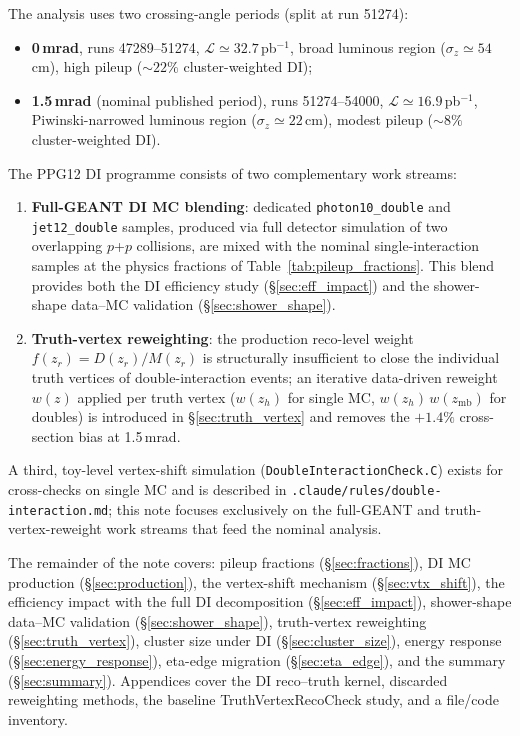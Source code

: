 \documentclass[11pt,a4paper]{article}
\newcommand{\pp}{\mbox{$p$+$p$}\xspace}
\begin{document}
The analysis uses two crossing-angle periods (split at run 51274):
\begin{itemize}
\item \textbf{0\,mrad}, runs 47289--51274, $\mathcal{L}\simeq 32.7$\,pb$^{-1}$,
      broad luminous region ($\sigma_z\!\simeq\!54$\,cm), high pileup
      ($\sim\!22\%$ cluster-weighted DI);
\item \textbf{1.5\,mrad} (nominal published period),
      runs 51274--54000, $\mathcal{L}\simeq 16.9$\,pb$^{-1}$,
      Piwinski-narrowed luminous region ($\sigma_z\!\simeq\!22$\,cm),
      modest pileup ($\sim\!8\%$ cluster-weighted DI).
\end{itemize}

The PPG12 DI programme consists of two complementary work streams:
\begin{enumerate}
\item \textbf{Full-GEANT DI MC blending}: dedicated
  \texttt{photon10\_double} and \texttt{jet12\_double} samples, produced
  via full detector simulation of two overlapping \pp collisions, are
  mixed with the nominal single-interaction samples at the physics
  fractions of Table~\ref{tab:pileup_fractions}. This blend provides both
  the DI efficiency study (\S\ref{sec:eff_impact}) and the
  shower-shape data--MC validation
  (\S\ref{sec:shower_shape}).
\item \textbf{Truth-vertex reweighting}: the production reco-level weight
  $f(z_r)=D(z_r)/M(z_r)$ is structurally insufficient to close the
  individual truth vertices of double-interaction events; an iterative
  data-driven reweight $w(z)$ applied per truth vertex
  ($w(z_h)$ for single MC, $w(z_h)\,w(z_\mathrm{mb})$ for doubles) is
  introduced in \S\ref{sec:truth_vertex} and removes the $+1.4\%$
  cross-section bias at 1.5\,mrad.
\end{enumerate}

A third, toy-level vertex-shift simulation
(\texttt{DoubleInteractionCheck.C}) exists for cross-checks on single MC
and is described in \texttt{.claude/rules/double-interaction.md}; this note
focuses exclusively on the full-GEANT and truth-vertex-reweight work
streams that feed the nominal analysis.

The remainder of the note covers: pileup fractions (\S\ref{sec:fractions}),
DI MC production (\S\ref{sec:production}), the vertex-shift mechanism
(\S\ref{sec:vtx_shift}), the efficiency impact with the full DI
decomposition (\S\ref{sec:eff_impact}), shower-shape data--MC validation
(\S\ref{sec:shower_shape}), truth-vertex reweighting
(\S\ref{sec:truth_vertex}), cluster size under DI (\S\ref{sec:cluster_size}),
energy response (\S\ref{sec:energy_response}),
eta-edge migration (\S\ref{sec:eta_edge}), and the summary
(\S\ref{sec:summary}). Appendices cover the DI reco--truth kernel,
discarded reweighting methods, the baseline TruthVertexRecoCheck study,
and a file/code inventory.
\end{document}
